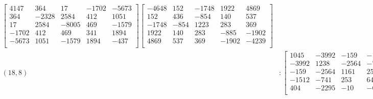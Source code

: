 \documentclass[12pt]{amsart}
\theoremstyle{plain}
\theoremstyle{definition}
\begin{document}
\begin{landscape}
\begin{align*}
\begin{bmatrix}
4147  &   364  &   17  &   -1702  &   -5673  \\ 
 364  &   -2328  &   2584  &   412  &   1051  \\ 
 17  &   2584  &   -8005  &   469  &   -1579  \\ 
 -1702  &   412  &   469  &   341  &   1894  \\ 
 -5673  &   1051  &   -1579  &   1894  &   -437  \\ 
\end{bmatrix}
\begin{bmatrix}
-4648  &   152  &   -1748  &   1922  &   4869  \\ 
 152  &   436  &   -854  &   140  &   537  \\ 
 -1748  &   -854  &   1223  &   283  &   369  \\ 
 1922  &   140  &   283  &   -885  &   -1902  \\ 
 4869  &   537  &   369  &   -1902  &   -4239  \\ 
\end{bmatrix}
\\
(18,8) &:
\begin{bmatrix}
1045  &   -3992  &   -159  &   -1512  &   404  \\ 
 -3992  &   1238  &   -2564  &   -741  &   -2295  \\ 
 -159  &   -2564  &   1161  &   253  &   -10  \\ 
 -1512  &   -741  &   253  &   643  &   -68  \\ 
 404  &   -2295  &   -10  &   -68  &   1599  \\ 
\end{bmatrix}
\begin{bmatrix}
636  &   -3757  &   2129  &   -1380  &   1695  \\ 
 -3757  &   582  &   1224  &   -1017  &   -2234  \\ 
 2129  &   1224  &   -1449  &   2467  &   1105  \\ 
 -1380  &   -1017  &   2467  &   -1086  &   -1056  \\ 
 1695  &   -2234  &   1105  &   -1056  &   1854  \\ 
\end{bmatrix}
\begin{bmatrix}
1527  &   -2094  &   944  &   -330  &   1565  \\ 
 -2094  &   2494  &   -1968  &   -736  &   -1335  \\ 
 944  &   -1968  &   -256  &   588  &   3628  \\ 
 -330  &   -736  &   588  &   -360  &   -34  \\ 

\end{bmatrix}
\end{align*}
\end{landscape}
\end{document}
